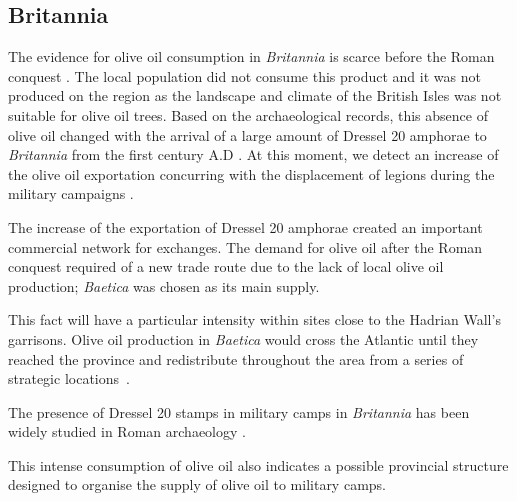 \documentclass[review]{elsarticle}
\newcommand{\memo}[2]{\textcolor{#1}{#2}}
\newcommand{\xavi}[1]{\memo{magenta}{XRC: #1\\}}
\begin{document}
\subsection{Britannia}

The evidence for olive oil consumption in \textit{Britannia} is scarce before the Roman conquest \citep{funari_corpus_1996,carreras_abastecimiento_2003}. The local population did not consume this product and it was not produced on the region as the landscape and climate of the British Isles was not suitable for olive oil trees\citep[161]{monfort_britanniaen_1998}. Based on the archaeological records, this absence of olive oil changed with the arrival of a large amount of Dressel 20 amphorae to \textit{Britannia} from the first century A.D \citep{peacock_amphorae_1991,
carreras_britannia_1998}. At this moment, we detect an increase of the olive oil exportation concurring with the displacement of legions during the military campaigns \citep[161]{monfort_britanniaen_1998}.

The increase of the exportation of Dressel 20 amphorae created an important commercial network for exchanges. The demand for olive oil after the Roman conquest required of a new trade route due to the lack of local olive oil production; \textit{Baetica} was chosen as its main supply.


This fact will have a particular intensity within sites close to the Hadrian Wall's garrisons. Olive oil production in \textit{Baetica} would cross the Atlantic until they reached the province and redistribute throughout the area from a series of strategic locations~\citep{carreras_atlantic_2012}. 


The presence of Dressel 20 stamps in military camps in \textit{Britannia} has been widely studied in Roman archaeology \citep{williams_importation_1983,
funari_corpus_1996,
carreras_britannia_1998,carreras_abastecimiento_2003}.

This intense consumption of olive oil also indicates a possible provincial structure designed to organise the supply of olive oil to military camps. 
\end{document}
